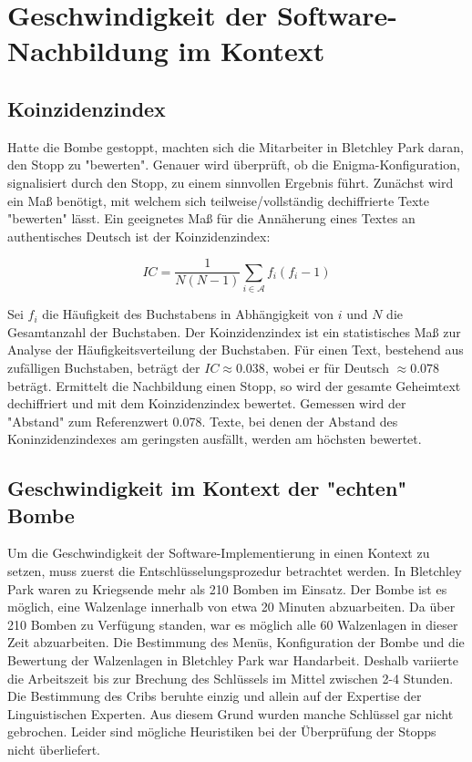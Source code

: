 \part{Geschwindigkeit der Software-Nachbildung im Kontext}\label{ch:speed}

\chapter{Koinzidenzindex}\label{sec:koinzidenzindex}
Hatte die Bombe gestoppt, machten sich die Mitarbeiter in Bletchley Park daran, den Stopp zu "bewerten". 
Genauer wird überprüft, ob die Enigma-Konfiguration, signalisiert durch den Stopp, zu einem sinnvollen Ergebnis führt.
Zunächst wird ein Maß benötigt, mit welchem sich teilweise/vollständig dechiffrierte Texte "bewerten" lässt.
Ein geeignetes Maß für die Annäherung eines Textes an authentisches Deutsch ist der Koinzidenzindex:

\begin{equation}
	\label{eq:koinzidenindex}
	IC = \frac{1}{N(N-1)}\sum_{i\in\mathcal{A}}f_i(f_i-1)
\end{equation}
	
	
Sei $f_i$ die Häufigkeit des Buchstabens in Abhängigkeit von $i$ und $N$ die Gesamtanzahl der Buchstaben.
Der Koinzidenzindex ist ein statistisches Maß zur Analyse der Häufigkeitsverteilung der Buchstaben.
Für einen Text, bestehend aus zufälligen Buchstaben, beträgt der $IC \approx 0.038$, wobei er für Deutsch $\approx 0.078$ beträgt.
Ermittelt die Nachbildung einen Stopp, so wird der gesamte Geheimtext dechiffriert und mit dem Koinzidenzindex bewertet.
Gemessen wird der "Abstand" zum Referenzwert 0.078.
Texte, bei denen der Abstand des Koninzidenzindexes am geringsten ausfällt, werden am höchsten bewertet.


\chapter{Geschwindigkeit im Kontext der "echten" Bombe}\label{sec:speed}
Um die Geschwindigkeit der Software-Implementierung in einen Kontext zu setzen, muss zuerst die Entschlüsselungsprozedur betrachtet werden.
In Bletchley Park waren zu Kriegsende mehr als 210 Bomben im Einsatz.
Der Bombe ist es möglich, eine Walzenlage innerhalb von etwa 20 Minuten abzuarbeiten.
Da über 210 Bomben zu Verfügung standen, war es möglich alle 60 Walzenlagen in dieser Zeit abzuarbeiten.
Die Bestimmung des Menüs, Konfiguration der Bombe und die Bewertung der Walzenlagen in Bletchley Park war Handarbeit.
Deshalb variierte die Arbeitszeit bis zur Brechung des Schlüssels im Mittel zwischen 2-4 Stunden.
Die Bestimmung des Cribs beruhte einzig und allein auf der Expertise der Linguistischen Experten. 
Aus diesem Grund wurden manche Schlüssel gar nicht gebrochen.
Leider sind mögliche Heuristiken bei der Überprüfung der Stopps nicht überliefert.

